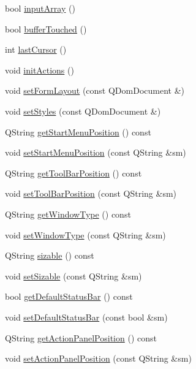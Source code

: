 \begin{DoxyCompactItemize}
\item 
bool \hyperlink{classFglForm_a452b19a215f6acbb86320ed3a8b32ead}{inputArray} ()
\item 
bool \hyperlink{classFglForm_ae6cab599f897bf58335df99e6d43b72d}{bufferTouched} ()
\item 
int \hyperlink{classFglForm_aab860a48ab46e95732543f3cb345ba26}{lastCursor} ()
\item 
void \hyperlink{classFglForm_af5e8206054e3275e2977056e685b73da}{initActions} ()
\item 
void \hyperlink{classFglForm_a6a923c50e859e58d34046d0b0f86c11d}{setFormLayout} (const QDomDocument \&)
\item 
void \hyperlink{classFglForm_a07c0926396e4229b40de7988689a1f16}{setStyles} (const QDomDocument \&)
\item 
QString \hyperlink{classFglForm_a40002405b99f9291e8f61944a775172a}{getStartMenuPosition} () const 
\item 
void \hyperlink{classFglForm_a2badc0486f40c57306fdefe14800a13b}{setStartMenuPosition} (const QString \&sm)
\item 
QString \hyperlink{classFglForm_ac138a537d43b85e677818e1a61f3cd3d}{getToolBarPosition} () const 
\item 
void \hyperlink{classFglForm_af3b00991b1e002fe156d0298468a2311}{setToolBarPosition} (const QString \&sm)
\item 
QString \hyperlink{classFglForm_a1e47b1b987a50ed9e4155bdf0664feba}{getWindowType} () const 
\item 
void \hyperlink{classFglForm_ad780eff8bf0437a8e33a9115885718e9}{setWindowType} (const QString \&sm)
\item 
QString \hyperlink{classFglForm_a714fbe1dca04c76d368a8a429b6322c1}{sizable} () const 
\item 
void \hyperlink{classFglForm_a805e33b8b74b0cc73dad05eac238f9db}{setSizable} (const QString \&sm)
\item 
bool \hyperlink{classFglForm_a9cacfea35fa0152d42b399fc6d2a2524}{getDefaultStatusBar} () const 
\item 
void \hyperlink{classFglForm_a4b2f8754ef3aa90fc46d04c2020ed5af}{setDefaultStatusBar} (const bool \&sm)
\item 
QString \hyperlink{classFglForm_a1d53398b0bf7a81f7d6f4fab65faa3dd}{getActionPanelPosition} () const 
\item 
void \hyperlink{classFglForm_a80b78ad88d0dc22b7f4df7a724794a13}{setActionPanelPosition} (const QString \&sm)
\item 

\end{DoxyCompactItemize}
